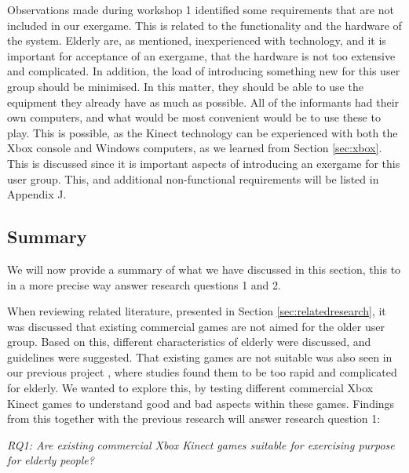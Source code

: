 Observations made during workshop 1 identified some requirements that are not included in our exergame. This is related to the functionality and the hardware of the system. Elderly are, as mentioned, inexperienced with technology, and it is important for acceptance of an exergame, that the hardware is not too extensive and complicated. In addition, the load of introducing something new for this user group should be minimised. In this matter, they should be able to use the equipment they already have as much as possible. All of the informants had their own computers, and what would be most convenient would be to use these to play. This is possible, as the Kinect technology can be experienced with both the Xbox console and Windows computers, as we learned from Section \ref{sec:xbox}. This is discussed since it is important aspects of introducing an exergame for this user group. This, and additional non-functional requirements will be listed in Appendix J.  

\subsection{Summary}
We will now provide a summary of what we have discussed in this section, this to in a more precise way answer research questions 1 and 2. 

When reviewing related literature, presented in Section \ref{sec:relatedresearch}, it was discussed that existing commercial games are not aimed for the older user group. Based on this, different characteristics of elderly were discussed, and guidelines were suggested. That existing games are not suitable was also seen in our previous project \cite{project}, where studies found them to be too rapid and complicated for elderly. We wanted to explore this, by testing different commercial Xbox Kinect games to understand good and bad aspects within these games. Findings from this together with the previous research will answer research question 1:

\emph{RQ1: Are existing commercial Xbox Kinect games suitable for exercising purpose for elderly people?}

